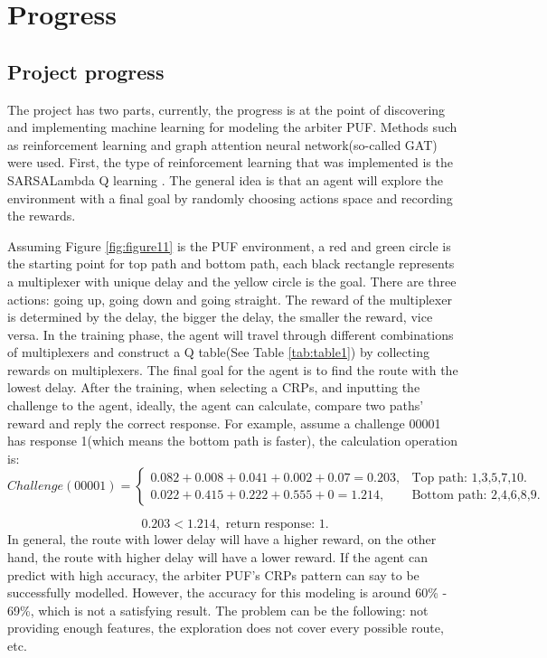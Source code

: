 \chapter{Progress}

\section{Project progress}
The project has two parts, currently, the progress is at the point of discovering and implementing machine learning for modeling the arbiter PUF. Methods such as reinforcement learning
and graph attention neural network(so-called GAT) were used. First, the type of reinforcement learning that was implemented is the SARSALambda Q learning \cite{Reference9}. The general idea is that an agent will 
explore the environment with a final goal by randomly choosing actions space and recording the rewards. 

Assuming Figure \ref{fig:figure11} is the PUF environment, a red and green circle is the starting point for top path and bottom path, each black rectangle represents a multiplexer with unique delay and the yellow 
circle is the goal. There are three actions: going up, going down and going straight. The reward of the multiplexer is determined by the delay, the bigger the delay, the smaller the reward, vice versa. In the training phase, 
the agent will travel through different combinations of multiplexers and construct a Q table(See Table \ref{tab:table1}) by collecting rewards on multiplexers. The final goal for the agent is to find the route with 
the lowest delay. After the training, when selecting a CRPs, and inputting the challenge to the agent, ideally, the agent can calculate, compare two paths' reward and reply the correct response. For example, assume 
a challenge 00001 has response 1(which means the bottom path is faster), the calculation operation is:
\begin{equation}
    Challenge(00001) =\begin{cases}
    0.082+0.008+0.041+0.002+0.07 = 0.203, & \text {Top path: 1,3,5,7,10}.\\
    0.022+0.415+0.222+0.555+0 = 1.214, & \text {Bottom path: 2,4,6,8,9}.
    \end{cases}
\end{equation}

\begin{equation}
    0.203 < 1.214, \text { return response: 1}.
\end{equation}
In general, the route with lower delay will have a higher reward, on the other hand, the route with higher delay will have a lower reward. If the agent can predict with high accuracy, the arbiter PUF's CRPs pattern can say to 
be successfully modelled. However, the accuracy for this modeling is around 60\% - 69\%, which is not a satisfying result. The problem can be the following: not providing enough features, the exploration does not 
cover every possible route, etc.

